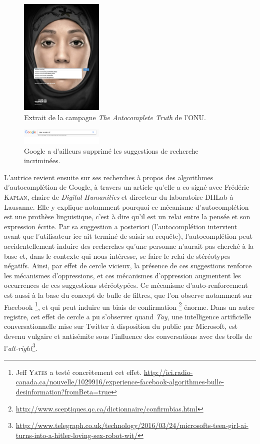 \documentclass[a4paper,12pt]{article}
\begin{document}
\begin{figure}[ht]
 \begin{center}
  \includegraphics[width=150px]{campagne.jpg}
 \end{center}
 \caption{Extrait de la campagne \textit{The Autocomplete Truth} de l'ONU.}
 \label{campagne}
\end{figure}

\begin{figure}[ht]
 \begin{center}
  \includegraphics[width=150px]{success.png}
 \end{center}
 \caption{Google a d'ailleurs supprimé les suggestions de recherche incriminées.}
 \label{succes}
\end{figure}

L'autrice revient ensuite sur ses recherches à propos des algorithmes d'autocomplétion de Google, à travers un article qu'elle a co-signé avec Frédéric \textsc{Kaplan}, chaire de \textit{Digital Humanities} et directeur du laboratoire DHLab à Lausanne. Elle y explique notamment pourquoi ce mécanisme d'autocomplétion est une prothèse linguistique, c'est à dire qu'il est un relai entre la pensée et son expression écrite. Par sa suggestion a posteriori (l'autocomplétion intervient avant que l'utilisateur-ice ait terminé de saisir sa requête), l'autocomplétion peut accidentellement induire des recherches qu'une personne n'aurait pas cherché à la base et, dans le contexte qui nous intéresse, se faire le relai de stéréotypes négatifs. Ainsi, par effet de cercle vicieux, la présence de ces suggestions renforce les mécanismes d'oppressions, et ces mécanismes d'oppression augmentent les occurrences de ces suggestions stéréotypées. Ce mécanisme d'auto-renforcement est aussi à la base du concept de bulle de filtres, que l'on observe notamment sur Facebook \footnote{Jeff \textsc{Yates} a testé concrètement cet effet. \url{http://ici.radio-canada.ca/nouvelle/1029916/experience-facebook-algorithmes-bulle-desinformation?fromBeta=true}}, et qui peut induire un biais de confirmation \footnote{\url{http://www.sceptiques.qc.ca/dictionnaire/confirmbias.html}} énorme. Dans un autre registre, cet effet de cercle a pu s'observer quand \textit{Tay}, une intelligence artificielle conversationnelle mise sur Twitter à disposition du public par Microsoft, est devenu vulgaire et antisémite sous l'influence des conversations avec des trolls de l'\textit{alt-right}\footnote{\url{http://www.telegraph.co.uk/technology/2016/03/24/microsofts-teen-girl-ai-turns-into-a-hitler-loving-sex-robot-wit/}}.
\end{document}
